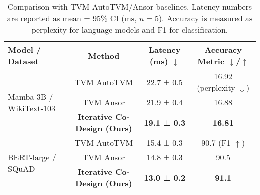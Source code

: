 \begin{table}[hbt!]
    \centering
    \caption{Comparison with TVM AutoTVM/Ansor baselines. Latency numbers are reported as mean ± 95\% CI (ms, $n=5$). Accuracy is measured as perplexity for language models and F1 for classification.}
    \label{tab:tvm_baseline}
    \begin{tabular}{l c c c}
        \toprule
        \textbf{Model / Dataset} & \textbf{Method} & \textbf{Latency (ms)} $\downarrow$ & \textbf{Accuracy Metric} $\downarrow$/$\uparrow$ \\
        \midrule
        \multirow{3}{*}{Mamba-3B / WikiText-103} & TVM AutoTVM & 22.7 ± 0.5 & 16.92 (perplexity $\downarrow$) \\
        & TVM Ansor & 21.9 ± 0.4 & 16.88 \\
        & \textbf{Iterative Co-Design (Ours)} & \textbf{19.1 ± 0.3} & \textbf{16.81} \\
        \midrule
        \multirow{3}{*}{BERT-large / SQuAD} & TVM AutoTVM & 15.4 ± 0.3 & 90.7 (F1 $\uparrow$) \\
        & TVM Ansor & 14.8 ± 0.3 & 90.5 \\
        & \textbf{Iterative Co-Design (Ours)} & \textbf{13.0 ± 0.2} & \textbf{91.1} \\
        \bottomrule
    \end{tabular}
\end{table}
